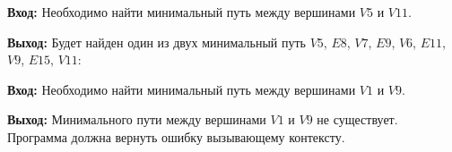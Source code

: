 \begin{test}
  \textbf{Вход:} Необходимо найти минимальный путь между вершинами
  $V5$ и $V11$.

  \testin[0.8]\testnum

  \textbf{Выход:} Будет найден один из двух минимальный путь $V5$,
  $E8$, $V7$, $E9$, $V6$, $E11$, $V9$, $E15$, $V11$:

  \testout[0.8]\testnum
\end{test}

\begin{test}
  \textbf{Вход:} Необходимо найти минимальный путь между вершинами
  $V1$ и $V9$.

  \testin[0.8]\testnum

  \textbf{Выход:} Минимального пути между вершинами $V1$ и $V9$ не
  существует. Программа должна вернуть ошибку вызывающему контексту.
\end{test}

